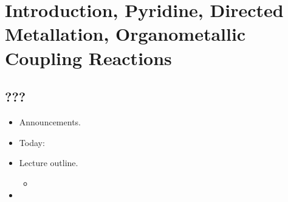 \documentclass[../notes.tex]{subfiles}
\begin{document}
\chapter{Introduction, Pyridine, Directed Metallation, Organometallic Coupling Reactions}
\section{???}
\begin{itemize}
    \item {}Announcements.
    \item Today: 
    \item Lecture outline.
    \begin{itemize}
        \item 
    \end{itemize}
    \item 
\end{itemize}
\end{document}
